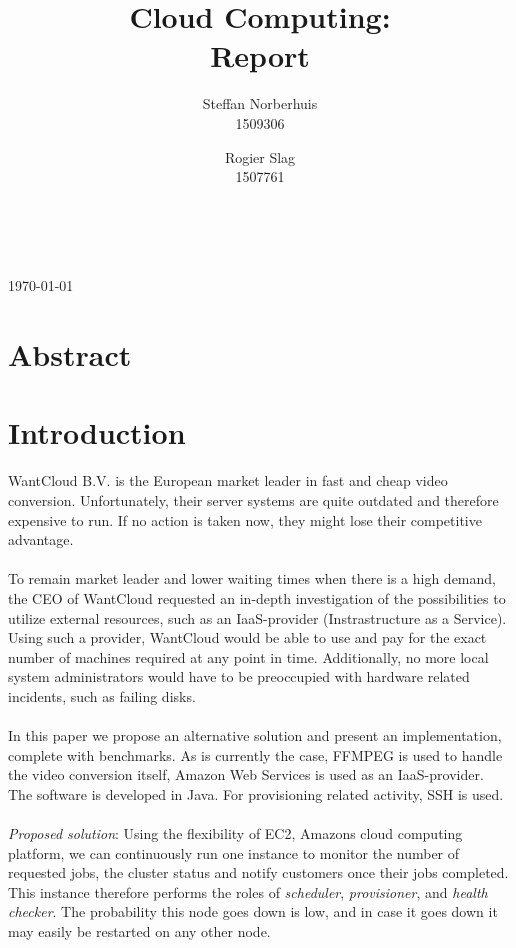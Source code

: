 \documentclass[a4paper]{IEEEtran}
\title{Cloud Computing: \\ Report}
\author{Steffan Norberhuis\\ 1509306 \and
 Rogier Slag\\ 1507761}
\author{
    \IEEEauthorblockN{Steffan Norberhuis, Rogier Slag}\\
    \IEEEauthorblockA{1509306, 1507761}
}
\begin{document}
\maketitle
\begin{center}
\today
\end{center}

\section{Abstract}


\section{Introduction}

WantCloud B.V. is the European market leader in fast and cheap video conversion. Unfortunately, their server systems are quite outdated and therefore expensive to run. If no action is taken now, they might lose their competitive advantage.\\
\\
To remain market leader and lower waiting times when there is a high demand, the CEO of WantCloud requested an in-depth investigation of the possibilities to utilize external resources, such as an IaaS-provider (Instrastructure as a Service). Using such a provider, WantCloud would be able to use and pay for the exact number of machines required at any point in time. Additionally, no more local system administrators would have to be preoccupied with hardware related incidents, such as failing disks.\\
\\
In this paper we propose an alternative solution and present an implementation, complete with benchmarks. As is currently the case, FFMPEG is used to handle the video conversion itself, Amazon Web Services is used as an IaaS-provider. The software is developed in Java. For provisioning related activity, SSH is used.\\
\\
\textit{Proposed solution}: Using the flexibility of EC2, Amazons cloud computing platform, we can continuously run one instance to monitor the number of requested jobs, the cluster status and notify customers once their jobs completed. This instance therefore performs the roles of \textit{scheduler}, \textit{provisioner}, and \textit{health checker}. The probability this node goes down is low, and in case it goes down it may easily be restarted on any other node.\\
\end{document}
